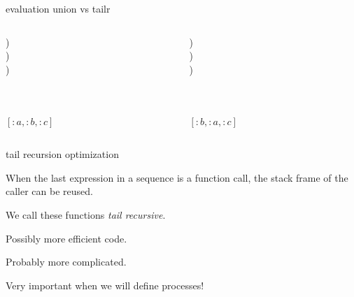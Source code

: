 \begin{frame}[fragile]{evaluation union vs tailr}

\begin{columns}
  \begin{column}{0.5\textwidth}
)\\
\pause\hspace{20pt}{\tt z = union([:b], [:c])})\\
\pause\hspace{40pt}{\tt z' = union([],[:c])})\\
\pause\hspace{60pt}{\tt [:c]}\\
\pause\hspace{40pt}{\tt [:b|z']}\\
\pause\hspace{20pt}{\tt [:a|z]}\\
\pause$[:a,:b,:c]$
\end{column}
\begin{column}{0.5\textwidth}
)\\
\pause\hspace{20pt}{\tt tailr([:b], [:a, :c])})\\
\pause\hspace{40pt}{\tt tailr([],[:b,:a,:c])})\\
\pause\hspace{60pt}{\tt [:b,:a:,:c]}\\
\pause\hspace{40pt}{\tt [:b,:a:,:c]}\\
\pause\hspace{20pt}{\tt [:b,:a:,:c]}\\
\pause$[:b,:a,:c]$
\end{column}
\end{columns}

\end{frame}


\begin{frame}{tail recursion optimization}

When the last expression in a sequence is a function call, the stack
frame of the caller can be reused.

\pause\vspace{20pt}We call these functions {\em tail recursive}.

\pause\vspace{20pt}Possibly more efficient code.

\pause\vspace{20pt}Probably more complicated.

\pause\vspace{20pt}Very important when we will define processes!

\end{frame}

